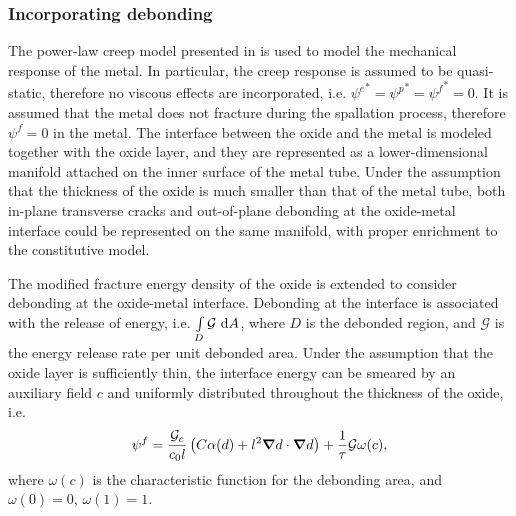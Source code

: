 \subsubsection{Incorporating debonding}

The power-law creep model presented in  is used to model the mechanical response of the metal. In particular, the creep response is assumed to be quasi-static, therefore no viscous effects are incorporated, i.e. ${\psi^e}^* = {\psi^p}^* = {\psi^f}^* = 0$. It is assumed that the metal does not fracture during the spallation process, therefore $\psi^f = 0$ in the metal. The interface between the oxide and the metal is modeled together with the oxide layer, and they are represented as a lower-dimensional manifold attached on the inner surface of the metal tube. Under the assumption that the thickness of the oxide is much smaller than that of the metal tube, both in-plane transverse cracks and out-of-plane debonding at the oxide-metal interface could be represented on the same manifold, with proper enrichment to the constitutive model.

The modified fracture energy density of the oxide is extended to consider debonding at the oxide-metal interface. Debonding at the interface is associated with the release of energy, i.e. $\int\limits_D \mathcal{G} \text{ d}A$, where $D$ is the debonded region, and $\mathcal{G}$ is the energy release rate per unit debonded area. Under the assumption that the oxide layer is sufficiently thin, the interface energy can be smeared by an auxiliary field $c$ and uniformly distributed throughout the thickness of the oxide, i.e.
\begin{align}
  \psi^f = \dfrac{{\mathcal{G}_c}}{c_0 l} \left( C\alpha(d) + l^2 \boldsymbol{\nabla} d \cdot \boldsymbol{\nabla} d \right) + \dfrac{1}{\tau} \mathcal{G} \omega(c),
\end{align}
where $\omega(c)$ is the characteristic function for the debonding area, and $\omega(0) = 0$, $\omega(1) = 1$.

